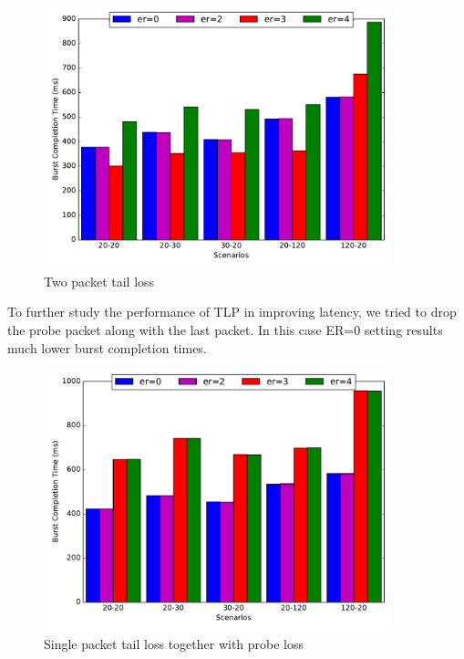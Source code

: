\documentclass[12pt,draftcls,onecolumn]{IEEEtran}
\begin{document}
\begin{figure}[!ht]
\begin{center}
\includegraphics[angle=0, width=0.9\textwidth,natwidth=578.16,natheight=433.62]{plots/2P.pdf}
\caption{Two packet tail loss}\label{2p}
\end{center}
\end{figure}

To further study the performance of TLP in improving latency, we tried to drop the probe packet along with the last packet. In this case ER=0
setting results much lower burst completion times. 

\begin{figure}[!ht]
\begin{center}
\includegraphics[angle=0, width=0.9\textwidth, natwidth=578.16,natheight=433.62]{plots/1PP.pdf}
\caption{Single packet tail loss together with probe loss}\label{1pp}
\end{center}
\end{figure}
\end{document}
